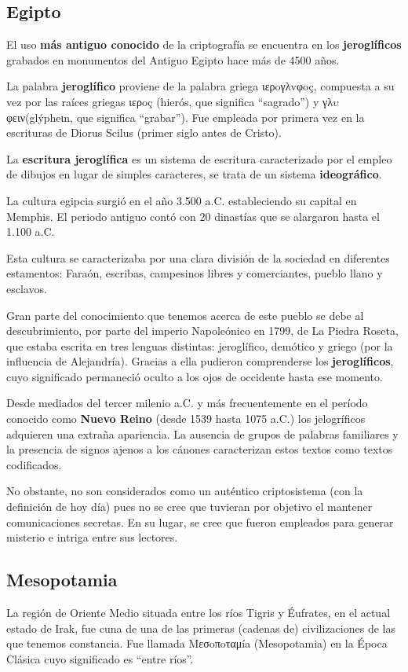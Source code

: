 \documentclass[nochap]{apuntesURJC}
\begin{document}
\subsection{Egipto}
El uso \textbf{más antiguo conocido} de la criptografía se encuentra en los \textbf{jeroglíficos} grabados en monumentos del Antiguo Egipto hace más de 4500 años.

La palabra \textbf{jeroglífico} proviene de la palabra griega ιερoγλvφoç, compuesta a su vez por las raíces griegas ιερoç (hierós, que significa ``sagrado'') y γλ$\upsilon$φειν(glýpheιn, que significa ``grabar''). Fue empleada por primera vez en la escrituras de Diorus Scilus (primer siglo antes de Cristo).

La \textbf{escritura jeroglífica} es un sistema de escritura caracterizado por el empleo de dibujos en lugar de simples caracteres, se trata de un sistema \textbf{ideográfico}.

La cultura egipcia surgió en el año 3.500 a.C. estableciendo su capital en Memphis. El periodo antiguo contó con 20 dinastías que se alargaron hasta el 1.100 a.C.

Esta cultura se caracterizaba por una clara división de la sociedad en diferentes estamentos: Faraón, escribas, campesinos libres y comerciantes, pueblo llano y esclavos.

Gran parte del conocimiento que tenemos acerca de este pueblo se debe al descubrimiento, por parte del imperio Napoleónico en 1799, de La Piedra Roseta, que estaba escrita en tres lenguas distintas: jeroglífico, demótico y griego (por la influencia de Alejandría). Gracias a ella pudieron comprenderse los \textbf{jeroglíficos}, cuyo significado permaneció oculto a los ojos de occidente hasta ese momento.


Desde mediados del tercer milenio a.C. y más frecuentemente en el período conocido como \textbf{Nuevo Reino} (desde 1539 hasta 1075 a.C.) los jelogríficos adquieren una extraña apariencia. La ausencia de grupos de palabras familiares y la presencia de signos ajenos a los cánones caracterizan estos textos como textos codificados.

No obstante, no son considerados como un auténtico criptosistema (con la definición de hoy día) pues no se cree que tuvieran por objetivo el mantener comunicaciones secretas. En su lugar, se cree que fueron empleados para generar misterio e intriga entre sus lectores.

\subsection{Mesopotamia}
La región de Oriente Medio situada entre los ríos Tigris y Éufrates, en el actual estado de Irak, fue cuna de una de las primeras (cadenas de) civilizaciones de las que tenemos constancia. Fue llamada Mεσoπoταμía (Mesopotamia) en la Época Clásica cuyo significado es ``entre ríos''.
\end{document}
